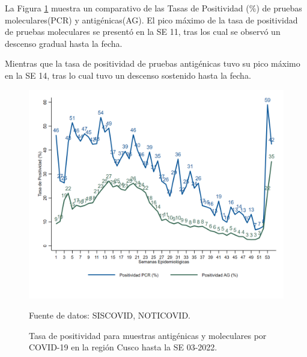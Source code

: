 \documentclass[12pt,a4paper,openany]{book}
\begin{document}
   La Figura \ref{fig:total_muestras_procesada} muestra un comparativo de las Tasas de Positividad ($\%$) de pruebas moleculares(PCR) y antigénicas(AG). El pico máximo de la tasa de positividad de pruebas moleculares se presentó en la SE 11, tras los cual se observó un descenso gradual hasta la fecha.
   
   Mientras que la tasa de positividad de pruebas antigénicas tuvo su pico máximo en la SE 14, tras lo cual tuvo un descenso sostenido hasta la fecha.
  
   
   \begin{figure}[h]
   	\caption{Tasa de positividad para muestras antigénicas y moleculares por COVID-19 en la región Cusco hasta la SE 03-2022. }\label{fig:total_muestras_procesada}
   	\begin{center}
   		\includegraphics[width=0.80\linewidth]{../figuras/positividad_diaria}
   	\end{center}
   	{\footnotesize {Fuente de datos: SISCOVID, NOTICOVID.}}
   \end{figure}
\end{document}
